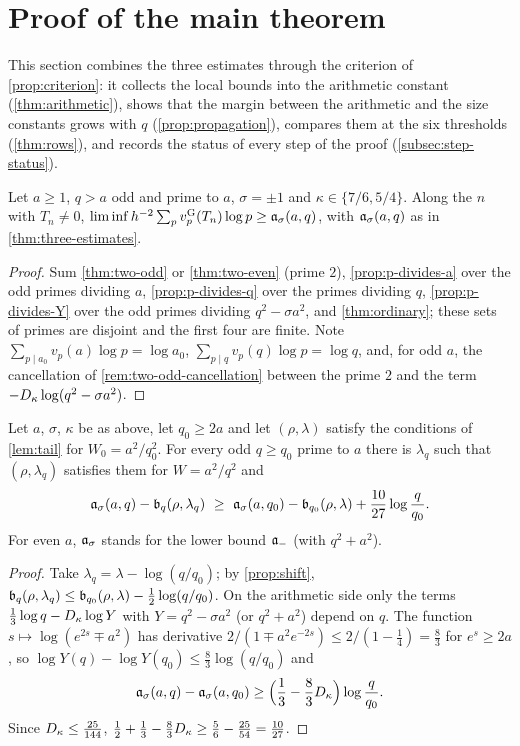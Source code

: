 \section{Proof of the main theorem}\label{sec:proofs}

This section combines the three estimates through the criterion of \cref{prop:criterion}: it
collects the local bounds into the arithmetic constant (\cref{thm:arithmetic}), shows that the margin
between the arithmetic and the size constants grows with $q$ (\cref{prop:propagation}), compares them
at the six thresholds (\cref{thm:rows}), and records the status of every step of the proof
(\cref{subsec:step-status}).

\begin{theorem}[arithmetic]\label{thm:arithmetic}
Let $a\ge1$, $q>a$ odd and prime to $a$, $\sigma=\pm1$ and $\kappa\in\{7/6,5/4\}$. Along the $n$
with $T_n\ne0$, $\liminf h^{-2}\sum_pv_{p}^{\mathrm{G}}(T_n)\log p\ge\mathfrak{a}_\sigma(a,q)$, with
$\mathfrak{a}_\sigma(a,q)$ as in \cref{thm:three-estimates}.
\end{theorem}

\begin{proof}
Sum \cref{thm:two-odd} or \cref{thm:two-even} (prime $2$), \cref{prop:p-divides-a} over the odd
primes dividing $a$, \cref{prop:p-divides-q} over the primes dividing $q$,
\cref{prop:p-divides-Y} over the odd primes dividing $q^2-\sigma a^2$, and \cref{thm:ordinary}; these
sets of primes are disjoint and the first four are finite. Note $\sum_{p\mid a_0}v_p(a)\log
p=\log a_0$, $\sum_{p\mid q}v_p(q)\log p=\log q$, and, for odd $a$, the cancellation of
\cref{rem:two-odd-cancellation} between the prime $2$ and the term $-D_\kappa\log(q^2-\sigma a^2)$.
\end{proof}

\begin{proposition}[propagation in $q$]\label{prop:propagation}
Let $a$, $\sigma$, $\kappa$ be as above, let $q_0\ge2a$ and let $(\rho,\lambda)$ satisfy the
conditions of \cref{lem:tail} for $W_0=a^2/q_0^2$. For every odd $q\ge q_0$ prime to $a$ there is
$\lambda_q$ such that $(\rho,\lambda_q)$ satisfies them for $W=a^2/q^2$ and
\[
  \aconst_\sigma(a,q)-\bconst_q(\rho,\lambda_q)\ \ge\ \aconst_\sigma(a,q_0)-\bconst_{q_0}(\rho,\lambda)
  +\frac{10}{27}\log\frac q{q_0}.
\]
For even $a$, $\mathfrak{a}_\sigma$ stands for the lower bound $\mathfrak{a}_-$ (with $q^2+a^2$).
\end{proposition}

\begin{proof}
Take $\lambda_q=\lambda-\log(q/q_0)$; by \cref{prop:shift}, $\mathfrak{b}_q(\rho,\lambda_q)\le
\mathfrak{b}_{q_0}(\rho,\lambda)-\frac12\log(q/q_0)$. On the arithmetic side only the terms
$\frac13\log q-D_\kappa\log Y$ with $Y=q^2-\sigma a^2$ (or $q^2+a^2$) depend on $q$. The function
$s\mapsto\log(e^{2s}\mp a^2)$ has derivative $2/(1\mp a^2e^{-2s})\le2/(1-\frac14)=\frac83$ for
$e^s\ge2a$, so $\log Y(q)-\log Y(q_0)\le\frac83\log(q/q_0)$ and
\[
  \mathfrak{a}_\sigma(a,q)-\mathfrak{a}_\sigma(a,q_0)\ge\Bigl(\frac13-\frac83D_\kappa\Bigr)\log\frac q{q_0}.
\]
Since $D_\kappa\le\frac{25}{144}$, $\frac12+\frac13-\frac83D_\kappa\ge\frac56-\frac{25}{54}=\frac{10}{27}$.
\end{proof}

